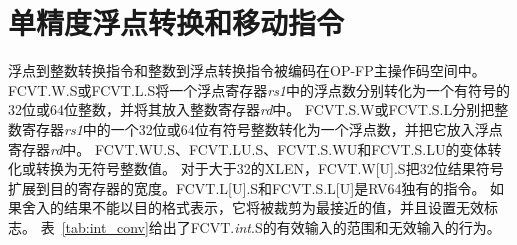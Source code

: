 \section{单精度浮点转换和移动\mbox{指令}}

浮点到整数转换指令和整数到浮点转换指令被编码在OP-FP主操作码空间中。
FCVT.W.S或FCVT.L.S将一个浮点寄存器{\em rs1}中的浮点数分别转化为一个有符号的32位或64位整数，并将其放入整数寄存器{\em rd}中。
FCVT.S.W或FCVT.S.L分别把整数寄存器{\em rs1}中的一个32位或64位有符号整数转化为一个浮点数，并把它放入浮点寄存器{\em rd}中。
FCVT.WU.S、FCVT.LU.S、FCVT.S.WU和FCVT.S.LU的变体转化或转换为无符号整数值。
对于大于32的XLEN，FCVT.W[U].S把32位结果符号扩展到目的寄存器的宽度。FCVT.L[U].S和FCVT.S.L[U]是RV64独有的指令。
如果舍入的结果不能以目的格式表示，它将被裁剪为最接近的值，并且设置无效标志。
表~\ref{tab:int_conv}给出了FCVT.{\em int}.S的有效输入的范围和无效输入的行为。

